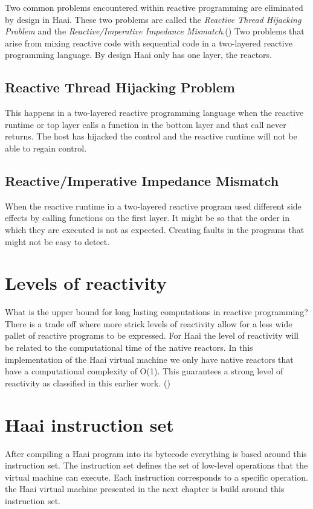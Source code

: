 \documentclass[a4paper]{book}
\begin{document}
Two common problems encountered within reactive programming are eliminated by design in Haai. These two problems are called the \textit{Reactive Thread Hijacking Problem} and the \textit{Reactive/Imperative Impedance Mismatch}.(\cite{vonder_tackling_2020}) Two problems that arise from mixing reactive code with sequential code in a two-layered reactive programming language. By design Haai only has one layer, the reactors.

\subsection*{Reactive Thread Hijacking Problem}
This happens in a two-layered reactive programming language when the reactive runtime or top layer calls a function in the bottom layer and that call never returns. The host has hijacked the control and the reactive runtime will not be able to regain control.  

\subsection*{Reactive/Imperative Impedance Mismatch}
When the reactive runtime in a two-layered reactive program used different side effects by calling functions on the first layer. It might be so that the order in which they are executed is not as expected. Creating faults in the programs that might not be easy to detect.

\section{Levels of reactivity}
What is the upper bound for long lasting computations in reactive programming? There is a trade off where more strick levels of reactivity allow for a less wide pallet of reactive programs to be expressed. For Haai the level of reactivity will be related to the computational time of the native reactors. In this implementation of the Haai virtual machine we only have native reactors that have a computational complexity of O(1). This guarantees a strong level of reactivity as classified in this earlier work. (\cite{vonder_tackling_2020})





\section{Haai instruction set}
After compiling a Haai program into its bytecode everything is based around this instruction set. The instruction set defines the set of low-level operations that the virtual machine can execute. Each instruction corresponds to a specific operation. the Haai virtual machine presented in the next chapter is build around this instruction set. 
\end{document}
